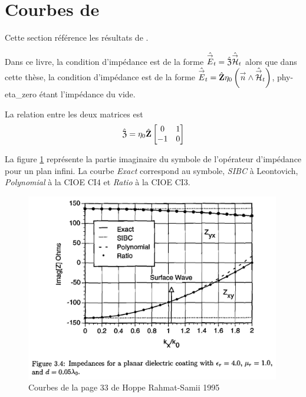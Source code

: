 \section{Courbes de \cite{hoppe_impedance_1995}}
\label{sec:annexe:hoppe}
Cette section référence les résultats de \cite{hoppe_impedance_1995}. 


Dans ce livre, la condition d'impédance est de la forme \(\hat{{\overset{\rightarrow}{E}}}_t = \hat{\mathfrak{Z}} \hat{{\overset{\rightarrow}{\mathcal{H}}}}_t\) alors que dans cette thèse, la condition d'impédance est de la forme \(\hat{{\overset{\rightarrow}{E}}}_t = \hat{\mathbf{Z}} \eta_0\left({\overset{\rightarrow}{n}} \wedge \hat{{\overset{\rightarrow}{\mathcal{H}}}}_t\right)\), \gls{phy-eta_zero} étant l'impédance du vide.

La relation entre les deux matrices est
\begin{equation}
  \hat{\mathfrak{Z}} = \eta_0\hat{\mathbf{Z}}\begin{bmatrix}0&1\\-1&0\end{bmatrix}
\end{equation}

La figure \ref{fig:annex:hoppe:p33} représente la partie imaginaire du symbole de l'opérateur d'impédance pour un plan infini. La courbe \textit{Exact} correspond au symbole, \textit{SIBC} à Leontovich, \textit{Polynomial} à la CIOE CI4 et \textit{Ratio} à la CIOE CI3.

\begin{figure}[h!tb]
    \includegraphics[width=0.99\textwidth]{images/hoppe/p33_imp_cylindre.png}
    \caption{Courbes de la page 33 de Hoppe Rahmat-Samii 1995}
    \label{fig:annex:hoppe:p33}
\end{figure}

